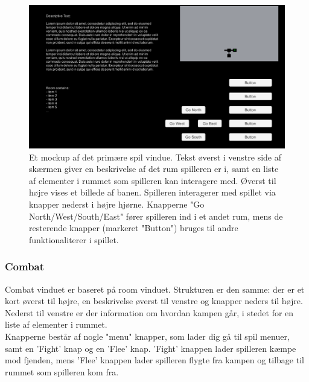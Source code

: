 \begin{figure}[h]
\centering
\includegraphics[width = \textwidth]{02-Body/Images/RoomMockup.PNG}
\caption{Et mockup af det primære spil vindue. Tekst øverst i venstre side af skærmen giver en beskrivelse af det rum spilleren er i, samt en liste af elementer i rummet som spilleren kan interagere med. Øverst til højre vises et billede af banen. Spilleren interagerer med spillet via knapper nederst i højre hjørne. Knapperne "Go {North/West/South/East}" fører spilleren ind i et andet rum, mens de resterende knapper (markeret "Button") bruges til andre funktionaliterer i spillet.}
\label{fig:Design-FE-mockup-room}
\end{figure}

\subsubsection{Combat}

Combat vinduet er baseret på room vinduet. Strukturen er den samme: der er et kort øverst til højre, en beskrivelse øverst til venstre og knapper neders til højre. Nederst til venstre er der information om hvordan kampen går,  i stedet for en liste af elementer i rummet.\\
Knapperne består af nogle "menu" knapper, som lader dig gå til spil menuer, samt en 'Fight' knap og en 'Flee' knap. 'Fight' knappen lader spilleren kæmpe mod fjenden, mens 'Flee' knappen lader spilleren flygte fra kampen og tilbage til rummet som spilleren kom fra.


